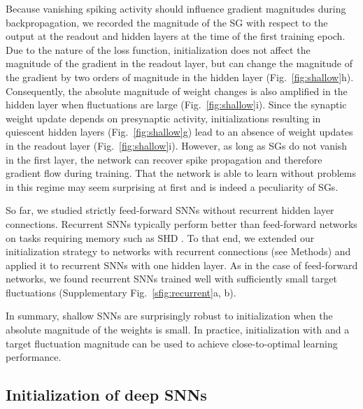 \documentclass[11pt,a4paper]{article}
\begin{document}
Because vanishing spiking activity should influence gradient magnitudes during backpropagation, we recorded the
magnitude of the \ac{SG} with respect to the output at the readout
and hidden layers at the time of the first training epoch.
Due to the nature of the loss function, initialization does not affect the
magnitude of the gradient in the readout layer, but can change the magnitude
of the gradient by two orders of magnitude in the hidden layer
(Fig.~\ref{fig:shallow}h). 
Consequently, the absolute magnitude of weight changes is
also amplified in the hidden layer when fluctuations are large
(Fig.~\ref{fig:shallow}i). 
Since the synaptic weight update depends on presynaptic activity,
initializations resulting in quiescent hidden layers
(Fig.~\ref{fig:shallow}g) lead to an absence of weight
updates in the readout layer (Fig.~\ref{fig:shallow}i). 
However, as long as \acp{SG} do not vanish in the first layer,
the network can recover spike propagation and therefore gradient flow during
training.
That the network is able to learn without problems in this regime may seem
surprising at first and is indeed a peculiarity of \acp{SG}.


So far, we studied strictly feed-forward \acp{SNN} without recurrent hidden
layer connections.
Recurrent \acp{SNN} typically perform better than feed-forward networks on
tasks requiring memory such as \ac{SHD} \citep{Zenke2021-zg}.
To that end, we extended our initialization strategy to networks
with recurrent connections (see Methods) and applied it to recurrent \acp{SNN}
with one hidden layer.
As in the case of feed-forward networks, we found recurrent \acp{SNN} trained
well with sufficiently small target fluctuations  (Supplementary Fig.~\ref{sfig:recurrent}a, b). 

In summary, shallow \acp{SNN} are surprisingly robust to initialization when
the absolute magnitude of the weights is small. In practice, initialization
with  and a target fluctuation magnitude  can be used
to achieve close-to-optimal learning performance.

\subsection*{Initialization of deep \acp{SNN}}
\end{document}

